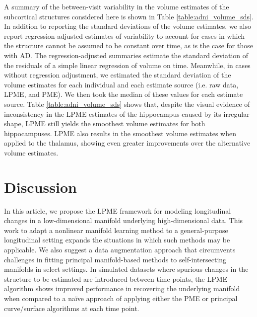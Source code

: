 \documentclass[12pt]{article}
\theoremstyle{definition}
\begin{document}
A summary of the between-visit variability in the volume estimates of the subcortical structures considered here is shown in Table \ref{table:adni_volume_sds}. In addition to reporting the standard deviations of the volume estimates, we also report regression-adjusted estimates of variability to account for cases in which the structure cannot be assumed to be constant over time, as is the case for those with AD. The regression-adjusted summaries estimate the standard deviation of the residuals of a simple linear regression of volume on time. Meanwhile, in cases without regression adjustment, we estimated the standard deviation of the volume estimates for each individual and each estimate source (i.e. raw data, LPME, and PME). We then took the median of these values for each estimate source. Table \ref{table:adni_volume_sds} shows that, despite the visual evidence of inconsistency in the LPME estimates of the hippocampus caused by its irregular shape, LPME still yields the smoothest volume estimates for both hippocampuses. LPME also results in the smoothest volume estimates when applied to the thalamus, showing even greater improvements over the alternative volume estimates.

\section{Discussion}\label{s:discussion}

In this article, we propose the LPME framework for modeling longitudinal changes in a low-dimensional manifold underlying high-dimensional data. This work to adapt a nonlinear manifold learning method to a general-purpose longitudinal setting expands the situations in which such methods may be applicable. We also suggest a data augmentation approach that circumvents challenges in fitting principal manifold-based methods to self-intersecting manifolds in select settings. In simulated datasets where spurious changes in the structure to be estimated are introduced between time points, the LPME algorithm shows improved performance in recovering the underlying manifold when compared to a naïve approach of applying either the PME or principal curve/surface algorithms at each time point.
\end{document}

